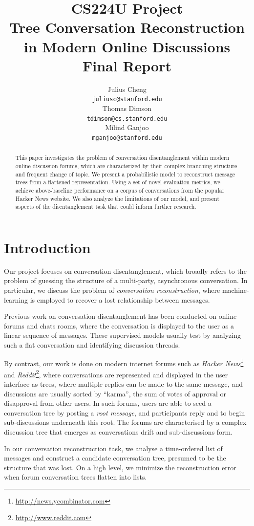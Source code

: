 \documentclass{article}
\title{{\small CS224U Project} \\ Tree Conversation Reconstruction in Modern Online Discussions \\ \small{Final Report}}
\author{Julius Cheng \\
  {\tt juliusc@stanford.edu}
  \\\And
  Thomas Dimson  \\
  {\tt tdimson@cs.stanford.edu}
  \\\AND
  Milind Ganjoo \\
  {\tt mganjoo@stanford.edu}
}
\date{}
\begin{document}
\maketitle
\begin{abstract}
This paper investigates the problem of conversation disentanglement within
modern online discussion forums, which are characterized by their complex
branching structure and frequent change of topic. We present a probabilistic
model to reconstruct message trees from a flattened representation. Using a
set of novel evaluation metrics, we achieve above-baseline performance on a
corpus of conversations from the popular Hacker News website. We also analyze
the limitations of our model, and present aspects of the disentanglement task
that could inform further research.
\end{abstract}

\section{Introduction}
Our project focuses on conversation disentanglement, which broadly refers to
the problem of guessing the structure of a multi-party, asynchronous
conversation. In particular, we discuss the problem of \textit{conversation
reconstruction}, where machine-learning is employed to recover a lost
relationship between messages.

Previous work on conversation disentanglement has been conducted on online
forums and chats rooms, where the conversation is displayed to the user as a
linear sequence of messages. These supervised models usually test by analyzing
such a flat conversation and identifying discussion threads.

By contrast, our work is done on modern internet forums such as
\textit{Hacker News}\footnote{\url{http://news.ycombinator.com}} 
and \textit{Reddit}\footnote{\url{http://www.reddit.com}}, where conversations
are represented and displayed in the user interface as trees, where multiple
replies can be made to the same message, and discussions are usually sorted by
``karma'', the sum of votes of approval or disapproval from other users. In
such forums, users are able to seed a conversation tree by posting a
\textit{root message}, and participants reply and to begin sub-discussions
underneath this root. The forums are characterised by a complex discussion
tree that emerges as conversations drift and sub-discussions form.

In our conversation reconstruction task, we analyse a time-ordered list of
messages and construct a candidate conversation tree, presumed to be the
structure that was lost. On a high level, we minimize the reconstruction error
when forum conversation trees flatten into lists.
\end{document}
